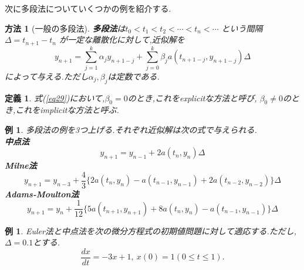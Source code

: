 \documentclass[a4paper,dvipdfmx]{jreport}
\numberwithin{equation}{section}
\newtheorem{Def}     [Thm]{定義}
\newtheorem{Ex}      [Thm]{例}
\newtheorem{Method}[Thm]{方法}
\renewenvironment{leftbar}{%
  \def\FrameCommand{\vrule width 1pt \hspace{10pt}}%
  \MakeFramed {\advance\hsize-\width \FrameRestore}}%
 {\endMakeFramed}
\def\method{\begin{leftbar}\begin{Method}}
\def\methodx{\end{Method}\end{leftbar}}
\def\defb{\begin{leftbar}\begin{Def}}
\def\defx{\end{Def}\end{leftbar}}
\def\ex{\begin{Ex}}
\def\exx{\end{Ex}}
\def\eq{\begin{equation}}
\def\eqx{\end{equation}}
\begin{document}
次に多段法についていくつかの例を紹介する.
\method[一般の多段法]
{\bf 多段法}は$ t_0 < t_1 < t_2 < \cdots < t_n < \cdots $ という間隔 $\Delta = t_{n+1} - t_{n}$ が一定な離散化に対して,近似解を
\eq
\label{eq29}
y_{n+1} = \sum_{j=1}^k \alpha_j y_{n+1-j}
+ \sum_{j=0}^k \beta_j a(t_{n+1-j},y_{n+1-j})\Delta
\eqx
によって与える.ただし$\alpha_j,\beta_j$は定数である.
\methodx
\defb
式(\ref{eq29})において,$\beta_0 = 0$のとき,これをexplicitな方法と呼び,
$\beta_0 \neq 0$のとき,これをimplicitな方法と呼ぶ.
\defx
\ex
多段法の例を3つ上げる.それぞれ近似解は次の式で与えられる.\\
\bf{中点法}
\eq y_{n+1} = y_{n-1} + 2a(t_n,y_n)\Delta \eqx
\bf{Milne法}
\eq y_{n+1} = y_{n-3} + \frac{4}{3}\{ 2a(t_n,y_n)- a(t_{n-1},y_{n-1}) + 2 a(t_{n-2},y_{n-2})\} \Delta \eqx
\bf{Adams-Moulton法}
\eq y_{n+1} = y_{n} + \frac{1}{12}\{ 5a(t_{n+1},y_{n+1})+ 8a(t_{n},y_{n}) - a(t_{n-1},y_{n-1})\} \Delta \eqx

\exx

\ex
Euler法と中点法を次の微分方程式の初期値問題に対して適応する.ただし,$\Delta = 0.1$とする.\\
\[
\frac{dx}{dt} = -3x + 1 , \ x(0) = 1  (0 \le t \le 1).
\]
\exx

\end{document}
